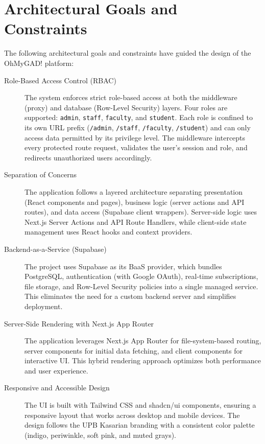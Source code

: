 \documentclass[11pt,a4paper]{article}
\begin{document}
\section{Architectural Goals and Constraints}
\label{sec:goals_constraints}

The following architectural goals and constraints have guided the design of the OhMyGAD! platform:

\begin{description}
  \item[Role-Based Access Control (RBAC)]
    The system enforces strict role-based access at both the middleware (proxy) and database (Row-Level Security) layers. Four roles are supported: \texttt{admin}, \texttt{staff}, \texttt{faculty}, and \texttt{student}. Each role is confined to its own URL prefix (\texttt{/admin}, \texttt{/staff}, \texttt{/faculty}, \texttt{/student}) and can only access data permitted by its privilege level. The middleware intercepts every protected route request, validates the user's session and role, and redirects unauthorized users accordingly.

  \item[Separation of Concerns]
    The application follows a layered architecture separating presentation (React components and pages), business logic (server actions and API routes), and data access (Supabase client wrappers). Server-side logic uses Next.js Server Actions and API Route Handlers, while client-side state management uses React hooks and context providers.

  \item[Backend-as-a-Service (Supabase)]
    The project uses Supabase as its BaaS provider, which bundles PostgreSQL, authentication (with Google OAuth), real-time subscriptions, file storage, and Row-Level Security policies into a single managed service. This eliminates the need for a custom backend server and simplifies deployment.

  \item[Server-Side Rendering with Next.js App Router]
    The application leverages Next.js App Router for file-system-based routing, server components for initial data fetching, and client components for interactive UI. This hybrid rendering approach optimizes both performance and user experience.

  \item[Responsive and Accessible Design]
    The UI is built with Tailwind CSS and shadcn/ui components, ensuring a responsive layout that works across desktop and mobile devices. The design follows the UPB Kasarian branding with a consistent color palette (indigo, periwinkle, soft pink, and muted grays).


\end{description}
\end{document}
